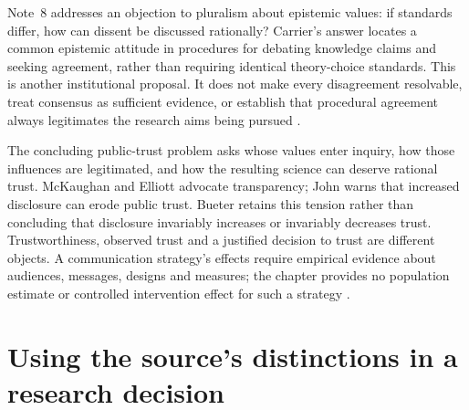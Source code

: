 Note~8 addresses an objection to pluralism about epistemic values: if
standards differ, how can dissent be discussed rationally? Carrier's
answer locates a common epistemic attitude in procedures for debating
knowledge claims and seeking agreement, rather than requiring identical
theory-choice standards. This is another institutional proposal. It does
not make every disagreement resolvable, treat consensus as sufficient
evidence, or establish that procedural agreement always legitimates the
research aims being pursued \cite[p.~763, notes~1,6--8]{Bueter2021ValueFreedom}.

The concluding public-trust problem asks whose values enter inquiry,
how those influences are legitimated, and how the resulting science can
deserve rational trust. McKaughan and Elliott advocate transparency;
John warns that increased disclosure can erode public trust. Bueter
retains this tension rather than concluding that disclosure invariably
increases or invariably decreases trust. Trustworthiness, observed trust
and a justified decision to trust are different objects. A communication
strategy's effects require empirical evidence about audiences, messages,
designs and measures; the chapter provides no population estimate or
controlled intervention effect for such a strategy
\cite[secs.~5, pp.~762--763]{Bueter2021ValueFreedom}.

\section{Using the source's distinctions in a research decision}
\label{sec:p11-rat142-use}

